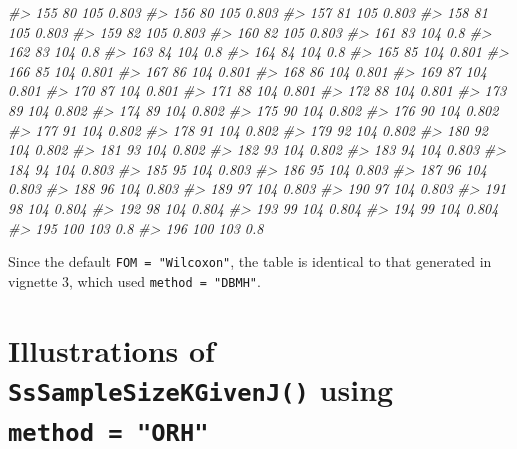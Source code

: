 \documentclass[]{book}
\newenvironment{Shaded}{\begin{snugshade}}{\end{snugshade}}
\newcommand{\CommentTok}[1]{\textcolor[rgb]{0.56,0.35,0.01}{\textit{#1}}}
\begin{document}
\begin{Shaded}
\begin{Highlighting}[]
\CommentTok{#> 155         80      105 0.803}
\CommentTok{#> 156         80      105 0.803}
\CommentTok{#> 157         81      105 0.803}
\CommentTok{#> 158         81      105 0.803}
\CommentTok{#> 159         82      105 0.803}
\CommentTok{#> 160         82      105 0.803}
\CommentTok{#> 161         83      104   0.8}
\CommentTok{#> 162         83      104   0.8}
\CommentTok{#> 163         84      104   0.8}
\CommentTok{#> 164         84      104   0.8}
\CommentTok{#> 165         85      104 0.801}
\CommentTok{#> 166         85      104 0.801}
\CommentTok{#> 167         86      104 0.801}
\CommentTok{#> 168         86      104 0.801}
\CommentTok{#> 169         87      104 0.801}
\CommentTok{#> 170         87      104 0.801}
\CommentTok{#> 171         88      104 0.801}
\CommentTok{#> 172         88      104 0.801}
\CommentTok{#> 173         89      104 0.802}
\CommentTok{#> 174         89      104 0.802}
\CommentTok{#> 175         90      104 0.802}
\CommentTok{#> 176         90      104 0.802}
\CommentTok{#> 177         91      104 0.802}
\CommentTok{#> 178         91      104 0.802}
\CommentTok{#> 179         92      104 0.802}
\CommentTok{#> 180         92      104 0.802}
\CommentTok{#> 181         93      104 0.802}
\CommentTok{#> 182         93      104 0.802}
\CommentTok{#> 183         94      104 0.803}
\CommentTok{#> 184         94      104 0.803}
\CommentTok{#> 185         95      104 0.803}
\CommentTok{#> 186         95      104 0.803}
\CommentTok{#> 187         96      104 0.803}
\CommentTok{#> 188         96      104 0.803}
\CommentTok{#> 189         97      104 0.803}
\CommentTok{#> 190         97      104 0.803}
\CommentTok{#> 191         98      104 0.804}
\CommentTok{#> 192         98      104 0.804}
\CommentTok{#> 193         99      104 0.804}
\CommentTok{#> 194         99      104 0.804}
\CommentTok{#> 195        100      103   0.8}
\CommentTok{#> 196        100      103   0.8}
\end{Highlighting}
\end{Shaded}

Since the default \texttt{FOM\ =\ "Wilcoxon"}, the table is identical to that generated in vignette 3, which used \texttt{method\ =\ "DBMH"}.

\hypertarget{illustrations-of-sssamplesizekgivenj-using-method-orh}{%
\section{\texorpdfstring{Illustrations of \texttt{SsSampleSizeKGivenJ()} using \texttt{method\ =\ "ORH"}}{Illustrations of SsSampleSizeKGivenJ() using method = "ORH"}}\label{illustrations-of-sssamplesizekgivenj-using-method-orh}}
\end{document}

